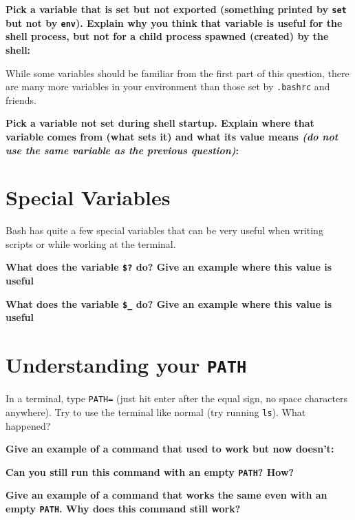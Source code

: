 \documentclass{article}
\begin{document}
\textbf{Pick a variable that is set but not exported (something printed by
  \texttt{set} but not by \texttt{env}). Explain why you think that
  variable is useful for the shell process, but not for a child process
  spawned (created) by the shell:
}
\vspace{2cm}


\noindent
While some variables should be familiar from the first part of this question,
there are many more variables in your environment than those set by
\texttt{.bashrc} and friends.

\textbf{Pick a variable not set during shell startup. Explain where that
variable comes from (what sets it) and what its value means
\emph{(do not use the same variable as the previous question)}:}


\newpage
\section{Special Variables}

Bash has quite a few special variables that can be very useful when writing
scripts or while working at the terminal.

\textbf{What does the variable \texttt{\$?} do? Give an example where this
value is useful}
\vspace{3cm}

\textbf{What does the variable \texttt{\$\_} do? Give an example where this
value is useful}
\vspace{3cm}


\section{Understanding your \texttt{PATH}}

In a terminal, type \texttt{PATH=} (just hit enter after the equal sign, no
space characters anywhere). Try to use the terminal like normal (try running
\texttt{ls}). What happened?

\textbf{Give an example of a command that used to work but now doesn't:}
\vspace{3cm}

\textbf{Can you still run this command with an empty \texttt{PATH}? How?}
\vspace{3cm}

\textbf{Give an example of a command that works the same even with an empty
\texttt{PATH}. Why does this command still work?}
\vspace{3cm}
\end{document}
